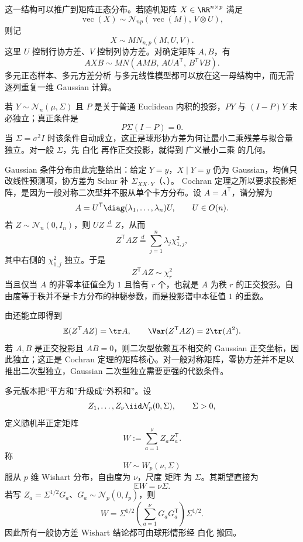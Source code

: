 这一结构可以推广到矩阵正态分布。若随机矩阵 $X\in\RR^{n\times p}$ 满足
\[
\operatorname{vec}(X)
\sim
\mathcal N_{np}(\operatorname{vec}(M),\,V\otimes U),
\]
则记
\begin{equation*}X\sim MN_{n,p}(M,U,V).\end{equation*}
这里 $U$ 控制行协方差、$V$ 控制列协方差。对确定矩阵 $A,B$，有
\begin{equation*}AXB
\sim
MN(AMB,\,AUA^{\mathsf T},\,B^{\mathsf T}VB).\end{equation*}
多元正态样本、多元方差分析 与多元线性模型都可以放在这一母结构中，而无需逐列重复一维 Gaussian 计算。

若 $Y\sim\mathcal N_n(\mu,\Sigma)$ 且 $P$ 是关于普通 Euclidean 内积的投影，$PY$ 与 $(I-P)Y$ 未必独立；真正条件是
\[
P\Sigma(I-P)=0.
\]
当 $\Sigma=\sigma^2I$ 时该条件自动成立，这正是球形协方差为何让最小二乘残差与拟合量独立。对一般 $\Sigma$，先 白化 再作正交投影，就得到 广义最小二乘 的几何。

Gaussian 条件分布由此完整给出：给定 $Y=y$，$X\mid Y=y$ 仍为 Gaussian，均值只改线性预测项，协方差为 Schur 补 $\Sigma_{XX\cdot Y}$（、）。
Cochran 定理之所以要求投影矩阵，是因为一般对称二次型并不服从单个卡方分布。设 $A=A^{\mathsf T}$，谱分解为
\[
A=U^{\mathsf T}\diag(\lambda_1,\ldots,\lambda_n)U,
\qquad U\in O(n).
\]
若 $Z\sim\mathcal N_n(0,I_n)$，则 $UZ\overset{d}=Z$，从而
\begin{equation}
\boxed{
Z^{\mathsf T}AZ
\overset{d}=\sum_{j=1}^n\lambda_j\chi^2_{1,j},
}
\label{eq:math-stat-general-gaussian-quadratic-form}
\end{equation}
其中右侧的 $\chi^2_{1,j}$ 独立。于是
\[
Z^{\mathsf T}AZ\sim\chi^2_r
\]
当且仅当 $A$ 的非零本征值全为 $1$ 且恰有 $r$ 个，也就是 $A$ 为秩 $r$ 的正交投影。自由度等于秩并不是卡方分布的神秘参数，而是投影谱中本征值 $1$ 的重数。

由还能立即得到
\begin{equation*}\mathbb E(Z^{\mathsf T}AZ)=\tr A,
\qquad
\Var(Z^{\mathsf T}AZ)=2\tr(A^2).\end{equation*}
若 $A,B$ 是正交投影且 $AB=0$，则二次型依赖互不相交的 Gaussian 正交坐标，因此独立；这正是 Cochran 定理的矩阵核心。对一般对称矩阵，零协方差并不足以推出二次型独立，Gaussian 二次型独立需要更强的代数条件。

多元版本把“平方和”升级成“外积和”。设
\[
Z_1,\ldots,Z_\nu\iid\mathcal N_p(0,\Sigma),
\qquad \Sigma>0,
\]
定义随机半正定矩阵
\begin{equation*}W:=\sum_{a=1}^{\nu}Z_aZ_a^{\mathsf T}.\end{equation*}
称
\[
W\sim W_p(\nu,\Sigma)
\]
服从 $p$ 维 Wishart 分布，自由度为 $\nu$，尺度 矩阵 为 $\Sigma$。其期望直接为
\begin{equation*}\mathbb E W=\nu\Sigma.\end{equation*}
若写 $Z_a=\Sigma^{1/2}G_a$、$G_a\sim\mathcal N_p(0,I_p)$，则
\begin{equation*}W
=\Sigma^{1/2}
\left(\sum_{a=1}^{\nu}G_aG_a^{\mathsf T}\right)
\Sigma^{1/2}.\end{equation*}
因此所有一般协方差 Wishart 结论都可由球形情形经 白化 搬回。

